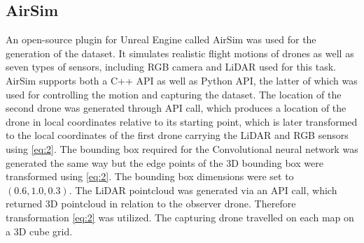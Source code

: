 \documentclass[twoside]{ctuthesis}
\theoremstyle{plain}
\theoremstyle{definition}
\theoremstyle{note}
\begin{document}
\subsection{AirSim}
An open-source plugin for Unreal Engine called AirSim was used for the generation of the dataset. It simulates realistic flight motions of drones as well as seven types of sensors, including RGB camera and LiDAR used for this task. AirSim supports both a C++ API as well as Python API, the latter of which was used for controlling the motion and capturing the dataset. The location of the second drone was generated through API call, which produces a location of the drone in local coordinates relative to its starting point, which is later transformed to the local coordinates of the first drone carrying the LiDAR and RGB sensors using \eqref{eq:2}. The bounding box required for the Convolutional neural network was generated the same way but the edge points of the 3D bounding box were transformed using \eqref{eq:2}. The bounding box dimensions were set to $(0.6, 1.0, 0.3)$. The LiDAR pointcloud was generated via an API call, which returned 3D pointcloud in relation to the observer drone. Therefore transformation \eqref{eq:2} was utilized. The capturing drone travelled on each map on a 3D cube grid.
\end{document}
